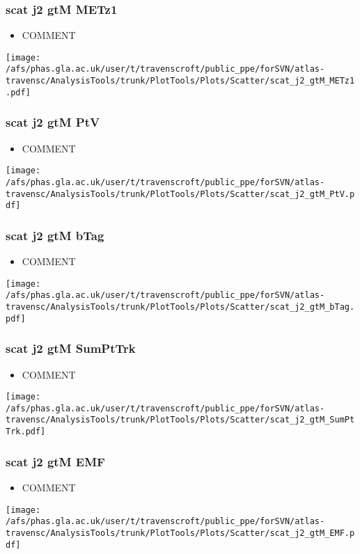\documentclass{beamer}
\begin{document}
\begin{frame}
\frametitle{scat j2 gtM METz1}
\begin{itemize}
\item COMMENT
\end{itemize}
\begin{center}
\texttt{[image: /afs/phas.gla.ac.uk/user/t/travenscroft/public\_ppe/forSVN/atlas-travensc/AnalysisTools/trunk/PlotTools/Plots/Scatter/scat\_j2\_gtM\_METz1.pdf]}
\end{center}
\end{frame}

\begin{frame}
\frametitle{scat j2 gtM PtV}
\begin{itemize}
\item COMMENT
\end{itemize}
\begin{center}
\texttt{[image: /afs/phas.gla.ac.uk/user/t/travenscroft/public\_ppe/forSVN/atlas-travensc/AnalysisTools/trunk/PlotTools/Plots/Scatter/scat\_j2\_gtM\_PtV.pdf]}
\end{center}
\end{frame}

\begin{frame}
\frametitle{scat j2 gtM bTag}
\begin{itemize}
\item COMMENT
\end{itemize}
\begin{center}
\texttt{[image: /afs/phas.gla.ac.uk/user/t/travenscroft/public\_ppe/forSVN/atlas-travensc/AnalysisTools/trunk/PlotTools/Plots/Scatter/scat\_j2\_gtM\_bTag.pdf]}
\end{center}
\end{frame}

\begin{frame}
\frametitle{scat j2 gtM SumPtTrk}
\begin{itemize}
\item COMMENT
\end{itemize}
\begin{center}
\texttt{[image: /afs/phas.gla.ac.uk/user/t/travenscroft/public\_ppe/forSVN/atlas-travensc/AnalysisTools/trunk/PlotTools/Plots/Scatter/scat\_j2\_gtM\_SumPtTrk.pdf]}
\end{center}
\end{frame}

\begin{frame}
\frametitle{scat j2 gtM EMF}
\begin{itemize}
\item COMMENT
\end{itemize}
\begin{center}
\texttt{[image: /afs/phas.gla.ac.uk/user/t/travenscroft/public\_ppe/forSVN/atlas-travensc/AnalysisTools/trunk/PlotTools/Plots/Scatter/scat\_j2\_gtM\_EMF.pdf]}
\end{center}
\end{frame}
\end{document}
